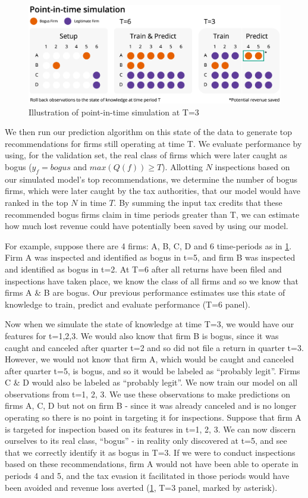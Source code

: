 \begin{figure}
  \includegraphics[width=1\columnwidth]{graphs/PointInTimeModel.png}
  \caption{Illustration of point-in-time simulation at T=3}
  \label{fig:PointInTimeSchematic}
\end{figure}

We then run our prediction algorithm on this state of the data to generate top recommendations for firms still operating at time T. We evaluate performance by using, for the validation set, the real class of firms which were later caught as bogus ($y_f=bogus$ and $max(Q(f)) \ge T$). Allotting $N$ inspections based on our simulated model's top recommendations, we determine the number of bogus firms, which were later caught by the tax authorities, that our model would have ranked in the top $N$ in time $T$. By summing the input tax credits that these recommended bogus firms claim in time periods greater than T, we can estimate how much lost revenue could have potentially been saved by using our model.

For example, suppose there are 4 firms: A, B, C, D and 6 time-periods as in \cref{fig:PointInTimeSchematic}. Firm A was inspected and identified as bogus in t=5, and firm B was inspected and identified as bogus in t=2. At T=6 after all returns have been filed and inspections have taken place, we know the class of all firms and so we know that firms A \& B are bogus. Our previous performance estimates use this state of knowledge to train, predict and evaluate performance (T=6 panel). 

Now when we simulate the state of knowledge at time T=3, we would have our features for t=1,2,3. We would also know that firm B is bogus, since it was caught and canceled after quarter t=2 and so did not file a return in quarter t=3. However, we would not know that firm A, which would be caught and canceled after quarter t=5, is bogus, and so it would be labeled as ``probably legit''. Firms C \& D would also be labeled as ``probably legit''. We now train our model on all observations from t=1, 2, 3. We use these observations to make predictions on firms A, C, D but not on firm B - since it was already canceled and is no longer operating so there is no point in targeting it for inspections. Suppose that firm A is targeted for inspection based on its features in t=1, 2, 3. We can now discern ourselves to its real class, ``bogus'' - in reality only discovered at t=5, and see that we correctly identify it as bogus in T=3. If we were to conduct inspections based on these recommendations, firm A would not have been able to operate in periods 4 and 5, and the tax evasion it facilitated in those periods would have been avoided and revenue loss averted (\cref{fig:PointInTimeSchematic}, T=3 panel, marked by asterisk). 

